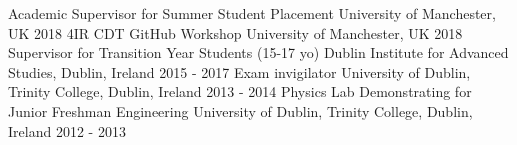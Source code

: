 \begin{cvpress}
   \cvpres
   {Academic Supervisor for Summer Student Placement}
    {University of Manchester, UK}
    {2018}
   \cvpres
   {4IR CDT GitHub Workshop}
    {University of Manchester, UK}
    {2018}
   \cvpres
   {Supervisor for Transition Year Students (15-17 yo)}
   {Dublin Institute for Advanced Studies, Dublin, Ireland}
   {2015 - 2017}
   \cvpres
   {Exam invigilator}
   {University of Dublin, Trinity College, Dublin, Ireland}
   {2013 - 2014}
   \cvpres
   {Physics Lab Demonstrating for Junior Freshman Engineering}
   {University of Dublin, Trinity College, Dublin, Ireland}
   {2012 - 2013}
\end{cvpress}


